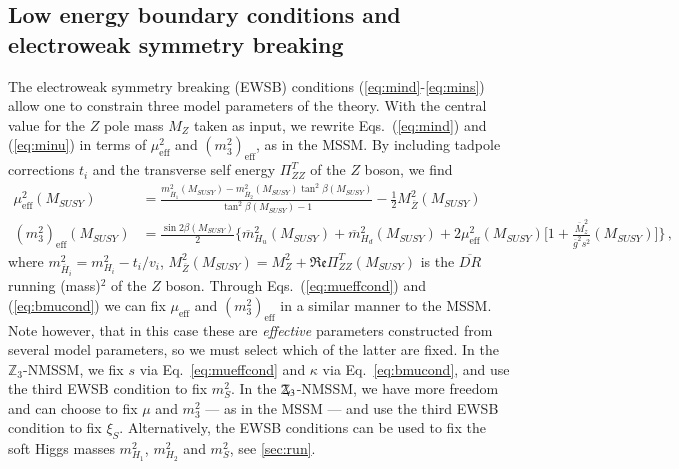 \documentclass[final,3p,times]{elsarticle}
\newcommand{\Zv}{\,\mathbf{\backslash}\mkern-11.0mu{\mathbb{Z}}_{3}} %
\begin{document}
\subsection{Low energy boundary conditions and electroweak 
symmetry breaking \label{ewsb}} 
The electroweak symmetry breaking (EWSB) conditions (\ref{eq:mind}-\ref{eq:mins}) 
allow one to constrain three model parameters of the theory.  With the central value 
for the $Z$ pole mass $M_Z$ taken as input, we rewrite Eqs.~(\ref{eq:mind}) and 
(\ref{eq:minu}) in terms of $\mu_\textrm{eff}^2$ and $(m_3^2)_\textrm{eff}$, as in 
the MSSM.  By including tadpole corrections $t_i$ and the transverse self energy $\Pi^T_{ZZ}$ of the 
$Z$ boson, we find
%
\begin{align}
  \mu_\textrm{eff}^2(M_{SUSY}) &=
  \frac{m_{\overline{H}_1}^2(M_{SUSY}) -
    m_{\overline{H}_2}^2(M_{SUSY}) \tan^2 \beta(M_{SUSY})}{\tan^2
    \beta(M_{SUSY}) - 1} - \frac{1}{2} M_{\overline Z}^2
  (M_{SUSY})\label{eq:mueffcond}\\ 
%
  (m^2_3)_\textrm{eff}(M_{SUSY})&=\frac{\sin{2\beta}(M_{SUSY})}{2}\Bigg\{\overline{m}_{H_u}^2(M_{SUSY})+\overline{m}_{H_d}^2(M_{SUSY})+
  2\mu_\textrm{eff}^2(M_{SUSY})\Bigg[1+\frac{\overline{M}_z^2}{\overline{g}^2s^2}(M_{SUSY})\Bigg]\Bigg\}\,,
  \label{eq:bmucond}
\end{align} 
% 
where 
$m_{\overline{H}_i}^2 = m_{H_i}^2 - t_i/v_i$, 
$M_{\overline Z}^2(M_{SUSY}) = M_Z^2 + \Re\mathfrak{e}\Pi_{ZZ}^T(M_{SUSY})$ is the 
$\overline{DR}$ running (mass)$^2$ of the $Z$ boson.  Through Eqs.~(\ref{eq:mueffcond}) and (\ref{eq:bmucond}) we
can fix $\mu_\textrm{eff}$ and $(m^2_3)_\textrm{eff}$ in a similar manner
to the MSSM.  Note however, that in this case these are {\it effective} 
parameters constructed from several model parameters, so we must select which
of the latter are fixed.
In the $\mathbb{Z}_3$-NMSSM, we fix $s$ via Eq.~\ref{eq:mueffcond} and $\kappa$
via Eq.~\ref{eq:bmucond}, and use the third EWSB condition to fix
$m_S^2$.  In the $\Zv$-NMSSM, we have more freedom and can choose to fix
$\mu$ and $m_3^2$ --- as in the MSSM --- and use the third EWSB
condition to fix $\xi_S$.
Alternatively, the EWSB conditions can be used to fix the soft Higgs
masses $m_{H_1}^2$, $m_{H_2}^2$ and $m_S^2$, see
\ref{sec:run}.
\end{document}
